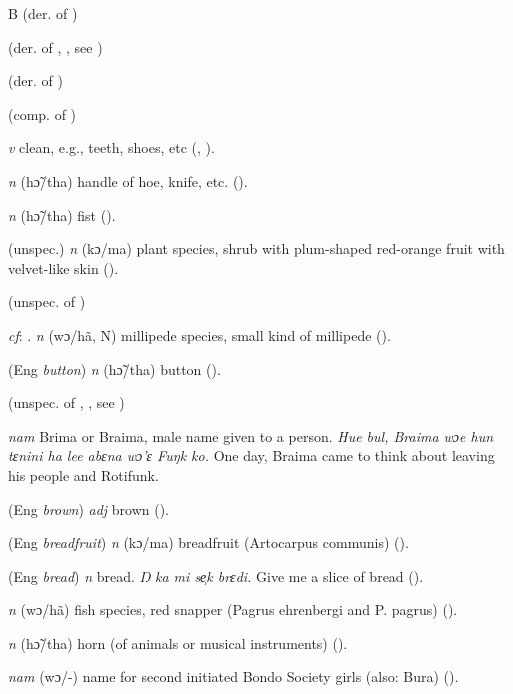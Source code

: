 \begin{letter}{B}
 (der. of ) 

 (der. of , , see )

 (der. of ) 

 (comp. of ) 

 \textit{v} clean, e.g., teeth, shoes, etc (\citealt{Pichl1967}, \citealt{Sumner1921}).

 \textit{n} (hɔ̃/tha) handle of hoe, knife, etc. (\citealt{Pichl1967}). 

 \textit{n} (hɔ̃/tha) fist (\citealt{Pichl1967}). 

 (unspec.) \textit{n} (kɔ/ma) plant species, shrub with plum-shaped red-orange fruit with velvet-like skin (\citealt{Pichl1967}).

 (unspec. of ) 

 \textit{cf}: . \textit{n} (wɔ/hã, N) millipede species, small kind of millipede (\citealt{Pichl1967}). 

 (Eng \textit{button}) \textit{n} (hɔ̃/tha) button (\citealt{Pichl1967}). 

 (unspec. of , , see ) 

 \textit{nam} Brima or Braima, male name given to a person. \textit{Hue bul, Braima wɔe hun tɛnini ha lee abɛna wɔ'ɛ Fuŋk ko.} One day, Braima came to think about leaving his people and Rotifunk.

 (Eng \textit{brown}) \textit{adj} brown (\citealt{Pichl1967}). 

 (Eng \textit{breadfruit}) \textit{n} (kɔ/ma) breadfruit (Artocarpus communis) (\citealt{Pichl1967}). 

 (Eng \textit{bread}) \textit{n} bread. \textit{Ŋ ka mi se̹k brɛdi.} Give me a slice of bread (\citealt{Pichl1967}). 

 \textit{n} (wɔ/hã) fish species, red snapper (Pagrus ehrenbergi and P. pagrus) (\citealt{Pichl1967}).

 \textit{n} (hɔ̃/tha) horn (of animals or musical instruments) (\citealt{Pichl1967}). 

 \textit{nam} (wɔ/-) name for second initiated Bondo Society girls (also: Bura) (\citealt{Pichl1967}).


\end{letter}
